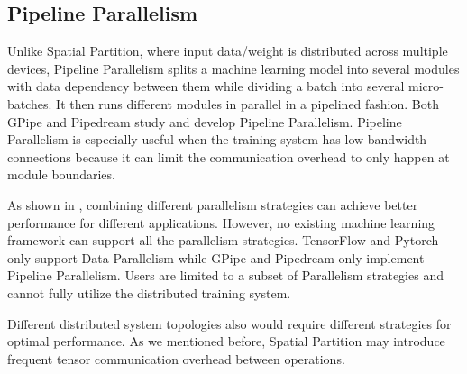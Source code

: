 \documentclass[sigplan, nonacm]{acmart}\settopmatter{printfolios=true,printccs=false,printacmref=false}
\begin{document}
 \subsection{Pipeline Parallelism}
 Unlike Spatial Partition, where input data/weight is distributed across multiple devices, Pipeline Parallelism splits a machine learning model into several modules with data dependency between them while dividing a batch into several micro-batches. It then runs different modules in parallel in a pipelined fashion. Both GPipe\cite{huang2019gpipe} and Pipedream\cite{narayanan2019pipedream} study and develop Pipeline Parallelism. Pipeline Parallelism is especially useful when the training system has low-bandwidth connections because it can limit the communication overhead to only happen at module boundaries.\par
 As shown in \cite{krizhevsky2014one}, combining different parallelism strategies can achieve better performance for different applications. However, no existing machine learning framework can support all the parallelism strategies. TensorFlow\cite{abadi2016tensorflow} and Pytorch\cite{paszke2019pytorch} only support Data Parallelism while GPipe\cite{huang2019gpipe} and Pipedream\cite{narayanan2019pipedream} only implement Pipeline Parallelism. Users are limited to a subset of Parallelism strategies and cannot fully utilize the distributed training system.\par
  Different distributed system topologies also would require different strategies for optimal performance. As we mentioned before, Spatial Partition may introduce frequent tensor communication overhead between operations.
\end{document}
